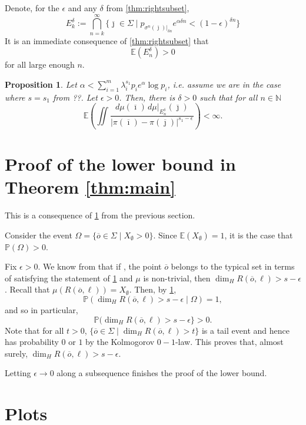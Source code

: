 \documentclass[12pt,]{article}
\newtheorem{proposition}[theorem]{Proposition}
\theoremstyle{definition}
\theoremstyle{remark}
\renewcommand{\Bbb}[1]{\mathbb{#1}}
\newcommand{\bbE}{{\Bbb E}}
\newcommand{\bbN}{{\Bbb N}}         %
\newcommand{\bbP}{{\Bbb P}}
\newcommand{\0}{\mathbf{0}}
\newcommand{\bi}{{\overline {\imath}}}
\newcommand{\bj}{{\overline  {\jmath}}}
\newcommand{\bo}{{\overline o}}
\begin{document}
Denote, for the $\epsilon$ and any $\delta$ from \cref{thm:rightsubset},
\[
  E_k^\delta:=\bigcap_{n=k}^\infty \{ \bj\in \Sigma\mid p_{\sigma^n(\bj)|_{\delta n}}e^{\alpha \delta n} < (1-\epsilon)^{\delta n}  \}
\]
It is an immediate consequence of \cref{thm:rightsubset} that
\[
  \bbE(E_n^\delta)>0
\]
for all large enough $n$.

\begin{proposition}\label{thm:finiteenergy}
  Let $\alpha<\sum_{i=1}^m \lambda_i^{s_1}p_ie^\alpha\log p_i$, i.e. assume we are in the case where
  $s=s_1$ from ??. Let $\epsilon>0$. Then, there is $\delta>0$ such that for all $n\in
  \bbN$
  \[
    \bbE \left(\iint\frac{d\mu(\bi)\,d\mu|_{E_n^\delta}(\bj)}{|\pi(\bi) - \pi(\bj)|^{s_1-\epsilon}}\right)<\infty.
  \]
\end{proposition}


\section{Proof of the lower bound in Theorem \ref{thm:main}}

This is a consequence of \cref{thm:finiteenergy} from the previous section.

Consider the event $\Omega=\{\bo\in \Sigma\mid X_{\emptyset}>0\}$. Since $\bbE(X_\emptyset)=1$, it is the case that $ \bbP(\Omega)>0$.

Fix $\epsilon>0$. We know from \cite{Falconer} that if , the point $\bo$ belongs to the typical set
in terms of satisfying the statement of \cref{thm:finiteenergy} and $\mu$ is non-trivial, then
$\dim_H R(\bo, \ell)>s-\epsilon$. Recall that $\mu(R(\bo, \ell))=X_\emptyset$. Then, by \cref{thm:finiteenergy},
\[
  \bbP(\dim_H R(\bo, \ell)>s-\epsilon\mid \Omega)=1,
\]
and so in particular,
\[
\bbP(\dim_H R(\bo, \ell)>s-\epsilon\}>0.
\]
Note that for all $t>0$, $\{\bo\in \Sigma\mid \dim_H R(\bo, \ell)>t\}$ is a tail event and hence has probability $0$ or $1$ by the Kolmogorov $0-1$-law. This proves that, almost surely, $\dim_H R(\bo, \ell)>s-\epsilon$.

Letting $\epsilon \to 0$ along a subsequence finishes the proof of the lower bound.


\section{Plots}

\end{document}
